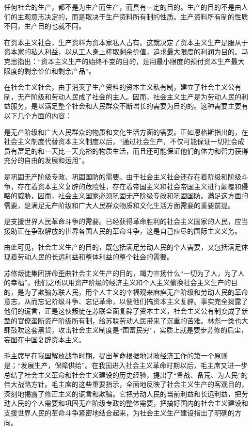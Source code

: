 \documentclass{book}
\begin{document}
任何社会的生产，都不是为生产而生产，而具有一定的目的。生产的目的不是由人们的主观意志决定的，而是取决于生产资料所有制的性质。生产资料所有制的性质不同，生产目的也就不同。

在资本主义社会，生产资料为资本家私人占有。这就决定了资本主义生产是服从于资本家的私人利益，以从工人身上榨取剩余价值，追求最大限度的利润为目的。马克思指出：“资本主义生产的始终不变的目的，是用最小限度的预付资本生产最大限度的剩余价值和剩余产品”。

在社会主义社会，由于消灭了生产资料的资本主义私有制，建立了社会主义公有制，无产阶级和劳动人民成了社会的主人。因而，社会主义生产是为劳动人民的利益服务，是以满足整个社会和人民群众不断增长的需要为目的的。这种需要主要有以下几个方面的内容：

是无产阶级和广大人民群众的物质和文化生活方面的需要。正如恩格斯指出的，在社会主义制度代替资本主义制度以后，“通过社会生产，不仅可能保证一切社会成员有富足的和一天比一天充裕的物质生活，而且还可能保证他们的体力和智力获得充分的自由的发展和运用”。

是巩固无产阶级专政、巩固国防的需要。由于社会主义社会还存在着阶级和阶级斗争，存在着资本主义复辟的危险性，存在着帝国主义和社会帝国主义进行颠覆和侵略的威胁，因而，社会主义国家必须巩固无产阶级专政和巩固国防。满足这方面的需要，是满足无产阶级和广大人民群众物质和文化生活方面需要的重要前提。

是支援世界人民革命斗争的需要。已经获得革命胜利的社会主义国家的人民，应当援助正在争取解放的世界各国人民的革命斗争，这是自己应尽的国际主义义务。

由此可见，社会主义生产的目的，既包括满足劳动人民的个人需要，又包括满足体现着劳动人民的长远利益和整体利益的整个社会的需要。

苏修叛徒集团拼命歪曲社会主义生产的目的，竭力宣扬什么“一切为了人，为了人的幸福”。他们之所以用资产阶级的经济主义和个人主义偷换社会主义生产的目的，是为了欺骗苏联人民，用个人主义的幸福观来麻痹无产阶级和劳动人民的革命意志，从而忘记阶级斗争、忘记革命，以便他们搞资本主义复辟。事实完全揭露了他们的谎言，正是这伙叛徒在苏联全面复辟了资本主义，社会主义公有制变成了新型的官僚垄断资产阶级所有制，给苏联劳动人民带来了沉重的苦难。林彪一类也大肆鼓吹这套黑货，攻击社会主义制度是“国富民穷”，实质上就是要步苏修的后尘，妄图在中国复辟资本主义。

毛主席早在我国解放战争时期，提出革命根据地财政经济工作的第一个原则是；“发展生产，保障供给”。在我国进入社会主义革命时期以后，毛主席又进一步总结了社会主义革命和社会主义建设的历史经验，提出了“备战、备荒、为人民”的伟大战略方针。毛主席的这些重要指示，全面地反映了社会主义生产的客观目的，深刻地揭露了修正主义的谎言和欺骗。它把劳动人民的当前利益和长远利益，把劳动人民的个人需要和巩固无产阶级专政的整体需要，把搞好国内的社会主义建设和支援世界人民的革命斗争紧密地结合起来，为社会主义生产建设指出了明确的方向。
\end{document}
